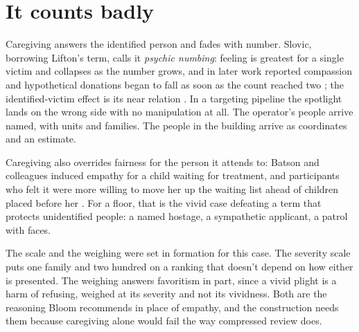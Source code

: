 \section{It counts badly}
\label{sec:20.9}
Caregiving answers the identified person and fades with number. Slovic, borrowing Lifton's term, calls it \emph{psychic numbing}: feeling is greatest for a single victim and collapses as the number grows, and in later work reported compassion and hypothetical donations began to fall as soon as the count reached two \autocite{slovic2007mass,vastfjall2014compassion}; the identified-victim effect is its near relation \autocite{kogut2005identified}.
In a targeting pipeline the spotlight lands on the wrong side with no manipulation at all. The operator's people arrive named, with units and families. The people in the building arrive as coordinates and an estimate.

Caregiving also overrides fairness for the person it attends to: Batson and colleagues induced empathy for a child waiting for treatment, and participants who felt it were more willing to move her up the waiting list ahead of children placed before her \autocite{batson1995immorality}.
For a floor, that is the vivid case defeating a term that protects unidentified people: a named hostage, a sympathetic applicant, a patrol with faces.

The scale and the weighing were set in formation for this case. The severity scale puts one family and two hundred on a ranking that doesn't depend on how either is presented. The weighing answers favoritism in part, since a vivid plight is a harm of refusing, weighed at its severity and not its vividness. Both are the reasoning Bloom recommends in place of empathy, and the construction needs them because caregiving alone would fail the way compressed review does.
